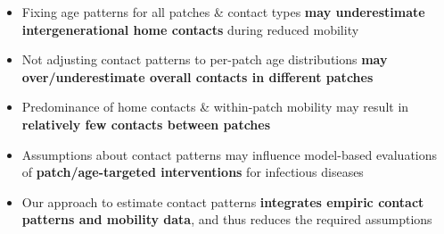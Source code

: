 \begin{itemize}
  \item Fixing age patterns for all patches \& contact types
        \textbf{may underestimate intergenerational home contacts} during reduced mobility
  \item Not adjusting contact patterns to per-patch age distributions
        \textbf{may over/underestimate overall contacts in different patches}
  \item Predominance of home contacts \& within-patch mobility may result in
        \textbf{relatively few contacts between patches}
  \item Assumptions about contact patterns may influence
        model-based evaluations of \textbf{patch/age-targeted interventions} for infectious diseases
  \item Our approach to estimate contact patterns \textbf{integrates empiric contact patterns and mobility data},
        and thus reduces the required assumptions
\end{itemize}